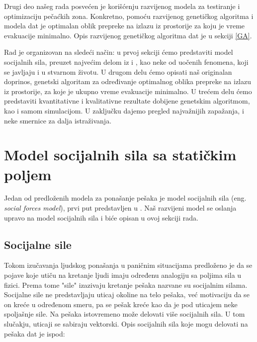 \documentclass[12pt]{article}
\begin{document}
Drugi deo našeg rada posvećen je korišćenju razvijenog modela za testiranje i optimizaciju pečaćkih zona. Konkretno, pomoću razvijenog genetičkog algoritma i modela dat je optimalan oblik prepreke na izlazu iz prostorije za koju je vreme evakuacije minimalno. Opis razvijenog genetičkog algoritma dat je u sekciji \ref{GA}. 

Rad je organizovan na sledeći način: u prvoj sekciji ćemo predstaviti model socijalnih sila, preuzet najvećim delom iz \citep{Helbing1998} i \citep{Helbing2002}, kao neke od uočenih fenomena, koji se javljaju i u stvarnom životu. U drugom delu ćemo opisati naš originalan doprinos, genetski algoritam za određivanje optimalnog oblika prepreke na izlazu iz prostorije, za koje je ukupno vreme evakuacije minimalno. U trećem delu ćemo predstaviti kvantitativne i kvalitativne rezultate dobijene genetskim algoritmom, kao i samom simulacijom. U zaključku dajemo pregled najvažnijih zapažanja, i neke smernice za dalja istraživanja.

\section{Model socijalnih sila sa statičkim poljem}
\label{sile}

Jedan od predloženih modela za ponašanje pešaka je model socijalnih sila (eng. \emph{social forces model}), prvi put predstavljen u \citep{Helbing1994}. Naš razvijeni model se oslanja upravo na model socijalnih sila i biće opisan u ovoj sekciji rada. 

    \subsection{Socijalne sile}

Tokom izučavanja ljudskog ponašanja u paničnim situacijama predloženo je da se pojave koje utiču na kretanje ljudi imaju određenu analogiju sa poljima sila u fizici. Prema tome "sile" izazivaju kretanje pešaka nazvane su socijalnim silama. Socijalne sile ne predstavljaju uticaj okoline na telo pešaka, već motivaciju da se on kreće u određenom smeru, pa se pešak kreće kao da je pod uticajem neke spoljašnje sile. Na pešaka istovremeno može delovati više socijalnih sila. U tom slučakju, uticaji se sabiraju vektorski. Opis socijalnih sila koje mogu delovati na pešaka dat je ispod:
\end{document}

